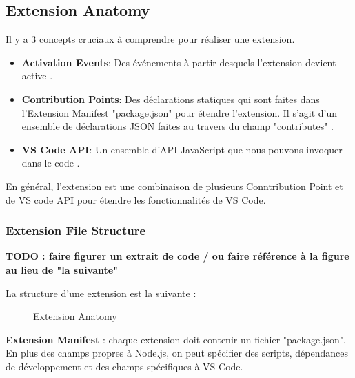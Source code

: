 \documentclass[
    iict, %
    il, %
]{heig-tb}
\begin{document}
\subsection{Extension Anatomy}
Il y a 3 concepts cruciaux à comprendre pour réaliser une extension.

\begin{itemize}
    \item \textbf{Activation Events}: Des événements à partir desquels l'extension devient active \cite{activation-events}.
    \item \textbf{Contribution Points}: Des déclarations statiques qui sont faites dans l'Extension Manifest "package.json" pour étendre l'extension. Il s'agit d'un ensemble de déclarations JSON faites au travers du champ "contributes" \cite{contribution-points}.
    \item \textbf{VS Code API}: Un ensemble d'API JavaScript que nous pouvons invoquer dans le code \cite{vs-code-api}.
\end{itemize}

En général, l'extension est une combinaison de plusieurs Conntribution Point et de VS code API pour étendre les fonctionnalités de VS Code.

\subsubsection{Extension File Structure}\label{Extension File Structure}

\textbf{TODO : faire figurer un extrait de code / ou faire référence à la figure au lieu de "la suivante" }

La structure d'une extension est la suivante :

\begin{figure}[!h]
    \begin{center}
    \end{center}
    \caption[Extension Anatomy]{\label{extension-anatomy} Extension Anatomy}
\end{figure}

\textbf{Extension Manifest} :
chaque extension doit contenir un fichier "package.json". En plus des champs propres à Node.js, on peut spécifier des scripts, dépendances de développement et des champs spécifiques à VS Code.
\end{document}
